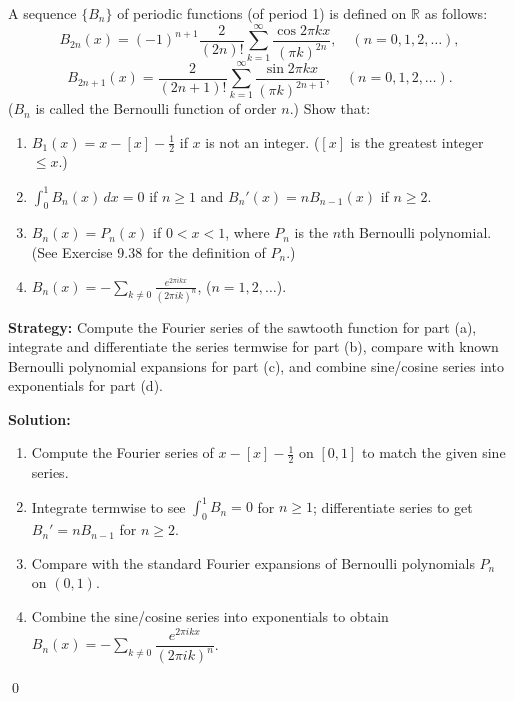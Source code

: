 \begin{problembox}
\begin{problemstatement}
A sequence $\{B_n\}$ of periodic functions (of period 1) is defined on $\mathbb{R}$ as follows:
\[
B_{2n}(x) = (-1)^{n+1} \frac{2}{(2n)!} \sum_{k=1}^\infty \frac{\cos 2\pi k x}{(\pi k)^{2n}}, \quad (n = 0, 1, 2, \dots),
\]
\[
B_{2n+1}(x) = \frac{2}{(2n + 1)!} \sum_{k=1}^\infty \frac{\sin 2\pi k x}{(\pi k)^{2n+1}}, \quad (n = 0, 1, 2, \dots).
\]
($B_n$ is called the Bernoulli function of order $n$.) Show that:
\begin{enumerate}[label=(\alph*)]
\item $B_1(x) = x - [x] - \frac{1}{2}$ if $x$ is not an integer. ($[x]$ is the greatest integer $\leq x$.)
\item $\int_0^1 B_n(x) \, dx = 0$ if $n \geq 1$ and $B_n'(x) = n B_{n-1}(x)$ if $n \geq 2$.
\item $B_n(x) = P_n(x)$ if $0 < x < 1$, where $P_n$ is the $n$th Bernoulli polynomial. (See Exercise 9.38 for the definition of $P_n$.)
\item $B_n(x) = -\sum_{k \neq 0} \frac{e^{2\pi i k x}}{(2\pi i k)^n}$, ($n = 1, 2, \dots$).
\end{enumerate}
\end{problemstatement}
\end{problembox}

\noindent\textbf{Strategy:} Compute the Fourier series of the sawtooth function for part (a), integrate and differentiate the series termwise for part (b), compare with known Bernoulli polynomial expansions for part (c), and combine sine/cosine series into exponentials for part (d).

\bigskip\noindent\textbf{Solution:}
\begin{enumerate}[label=(\alph*)]
\item Compute the Fourier series of $x-[x]-\tfrac12$ on $[0,1]$ to match the given sine series.
\item Integrate termwise to see $\int_0^1 B_n=0$ for $n\ge1$; differentiate series to get $B_n'=nB_{n-1}$ for $n\ge2$.
\item Compare with the standard Fourier expansions of Bernoulli polynomials $P_n$ on $(0,1)$.
\item Combine the sine/cosine series into exponentials to obtain $B_n(x)=-\sum_{k\ne0}\dfrac{e^{2\pi i k x}}{(2\pi i k)^n}$.
\end{enumerate}\qed



